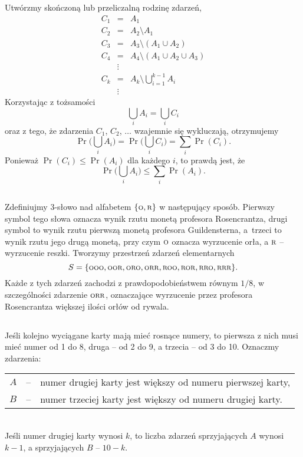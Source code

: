 \subsection{} %
Utwórzmy skończoną lub przeliczalną rodzinę zdarzeń,
\begin{eqnarray*}
	C_1 &=& A_1 \\
	C_2 &=& A_2\setminus A_1 \\
	C_3 &=& A_3\setminus (A_1\cup A_2) \\
	C_4 &=& A_4\setminus (A_1\cup A_2\cup A_3) \\
	& \vdots \\
	C_k &=& A_k\setminus \bigcup_{i=1}^{k-1}A_i \\
	& \vdots
\end{eqnarray*}
Korzystając z tożsamości
\[
	\bigcup_iA_i = \bigcup_iC_i
\]
oraz z tego, że zdarzenia $C_1$, $C_2$, $\dots$ wzajemnie się wykluczają, otrzymujemy
\[
	\Pr\biggl(\bigcup_iA_i\biggr) = \Pr\biggl(\bigcup_iC_i\biggr) = \sum_i\Pr(C_i).
\]
Ponieważ $\Pr(C_i)\le\Pr(A_i)$ dla każdego $i$, to prawdą jest, że
\[
	\Pr\biggl(\bigcup_iA_i\biggr) \le \sum_i\Pr(A_i).
\]

\subsection{} %
Zdefiniujmy $3$-słowo nad alfabetem $\{{\scriptstyle\rm O},{\scriptstyle\rm R}\}$ w następujący sposób. Pierwszy symbol tego słowa oznacza wynik rzutu monetą profesora Rosencrantza, drugi symbol to wynik rzutu pierwszą monetą profesora Guildensterna, a~trzeci to wynik rzutu jego drugą monetą, przy czym $\scriptstyle\rm O$ oznacza wyrzucenie orła, a $\scriptstyle\rm R$ -- wyrzucenie reszki. Tworzymy przestrzeń zdarzeń elementarnych
\[
	S = \{{\scriptstyle\rm OOO},{\scriptstyle\rm OOR},{\scriptstyle\rm ORO},{\scriptstyle\rm ORR},{\scriptstyle\rm ROO},{\scriptstyle\rm ROR},{\scriptstyle\rm RRO},{\scriptstyle\rm RRR}\}.
\]
Każde z tych zdarzeń zachodzi z prawdopodobieństwem równym $1/8$, w szczególności zdarzenie $\scriptstyle\rm ORR$, oznaczające wyrzucenie przez profesora Rosencrantza większej ilości orłów od rywala.

\subsection{} %
Jeśli kolejno wyciągane karty mają mieć rosnące numery, to pierwsza z nich musi mieć numer od 1 do 8, druga -- od 2 do 9, a trzecia -- od 3 do 10. Oznaczmy zdarzenia: \\
\begin{tabular}{rcl}
	$A$ &--& numer drugiej karty jest większy od numeru pierwszej karty, \\
	$B$ &--& numer trzeciej karty jest większy od numeru drugiej karty.
\end{tabular}
\\
Jeśli numer drugiej karty wynosi $k$, to liczba zdarzeń sprzyjających $A$ wynosi $k-1$, a sprzyjających $B$ -- $10-k$.

